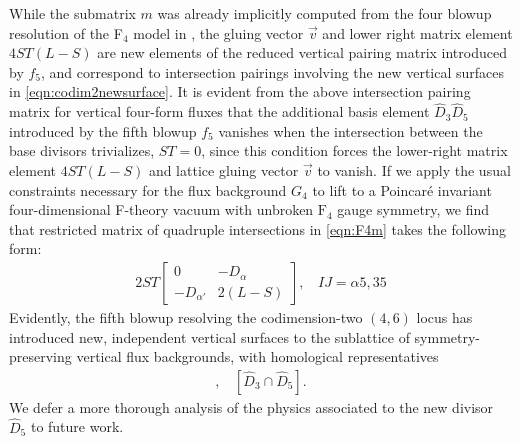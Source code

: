 \documentclass[11pt,oneside,english]{article}
\numberwithin{equation}{section}
\theoremstyle{definition}
\begin{document}
While the submatrix $m$ was already implicitly computed from the four blowup resolution of the F$_4$ model in \cite{Jefferson:2021bid}, the gluing vector $\vec v$ and lower right matrix element $4ST (L-S)$ are new elements of the reduced vertical pairing matrix introduced by $f_5$, and correspond to intersection pairings involving the new vertical surfaces in \cref{eqn:codim2newsurface}. It is evident from the above intersection pairing matrix for vertical four-form fluxes that the additional basis element $\hat D_3 \hat D_5$ introduced by the fifth blowup $f_5$ vanishes when the intersection between the base divisors trivializes, $S T =0$, since this condition forces the lower-right matrix element $4 ST (L-S)$ and lattice gluing vector $\vec v$ to vanish. If we apply the usual constraints necessary for the flux background $G_4$ to lift to a Poincar\'e invariant four-dimensional F-theory vacuum with unbroken $\text{F}_4$ gauge symmetry, we find that restricted matrix of quadruple intersections in \cref{eqn:F4m} takes the following form:
	\begin{align}
		 2 ST \begin{bmatrix} 0 & - D_\alpha  \\ - D_{\alpha'}  & 2 (L-S)\end{bmatrix},~~~~IJ = \alpha 5, 35
	\end{align}
Evidently, the fifth blowup resolving the codimension-two $(4,6)$ locus has introduced new, independent vertical surfaces to the sublattice of symmetry-preserving vertical flux backgrounds, with homological representatives
	\begin{align}
		[\hat D_\alpha \cap \hat D_5], ~~~~[ \hat D_3 \cap \hat D_5].
	\end{align} 
We defer a more thorough analysis of the physics associated to the new divisor $\hat D_5$ to future work.
\end{document}
